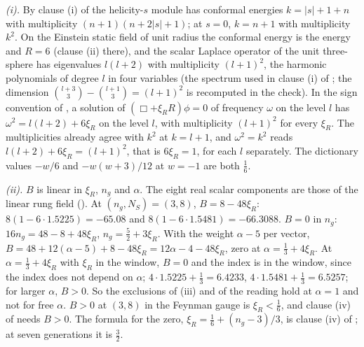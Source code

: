 \emph{(i).} By clause (i) of  the helicity-$s$ module has conformal energies $k = |s| + 1 + n$ with multiplicity $(n + 1)(n + 2|s| + 1)$; at $s = 0$, $k = n + 1$ with multiplicity $k^{2}$. On the Einstein static field of unit radius the conformal energy is the energy and $R = 6$ (clause (ii) there), and the scalar Laplace operator of the unit three-sphere has eigenvalues $l(l + 2)$ with multiplicity $(l + 1)^{2}$, the harmonic polynomials of degree $l$ in four variables (the spectrum used in clause (i) of ; the dimension $\binom{l+3}{3} - \binom{l+1}{3} = (l+1)^{2}$ is recomputed in the check). In the sign convention of , a solution of $(\Box + \xi_{R}R)\phi = 0$ of frequency $\omega$ on the level $l$ has $\omega^{2} = l(l + 2) + 6\xi_{R}$ on the level $l$, with multiplicity $(l + 1)^{2}$ for every $\xi_{R}$. The multiplicities already agree with $k^{2}$ at $k = l + 1$, and $\omega^{2} = k^{2}$ reads $l(l + 2) + 6\xi_{R} = (l + 1)^{2}$, that is $6\xi_{R} = 1$, for each $l$ separately. The dictionary values $-w/6$ and $-w(w + 3)/12$ at $w = -1$ are both $\tfrac16$.

\emph{(ii).} $B$ is linear in $\xi_{R}$, $n_{g}$ and $\alpha$. The eight real scalar components are those of the linear rung field (). At $(n_{g}, N_{S}) = (3, 8)$, $B = 8 - 48\xi_{R}$: $8(1 - 6\cdot1.5225) = -65.08$ and $8(1 - 6\cdot1.5481) = -66.3088$. $B = 0$ in $n_{g}$: $16n_{g} = 48 - 8 + 48\xi_{R}$, $n_{g} = \tfrac52 + 3\xi_{R}$. With the weight $\alpha - 5$ per vector, $B = 48 + 12(\alpha - 5) + 8 - 48\xi_{R} = 12\alpha - 4 - 48\xi_{R}$, zero at $\alpha = \tfrac13 + 4\xi_{R}$. At $\alpha = \tfrac13 + 4\xi_{R}$ with $\xi_{R}$ in the window, $B = 0$ and the index is in the window, since the index does not depend on $\alpha$; $4\cdot1.5225 + \tfrac13 = 6.4233$, $4\cdot1.5481 + \tfrac13 = 6.5257$; for larger $\alpha$, $B > 0$. So the exclusions of (iii) and of the reading hold at $\alpha = 1$ and not for free $\alpha$. $B > 0$ at $(3, 8)$ in the Feynman gauge is $\xi_{R} < \tfrac16$, and clause (iv) of  needs $B > 0$. The formula for the zero, $\xi_{R} = \tfrac16 + (n_{g} - 3)/3$, is clause (iv) of ; at seven generations it is $\tfrac32$.

